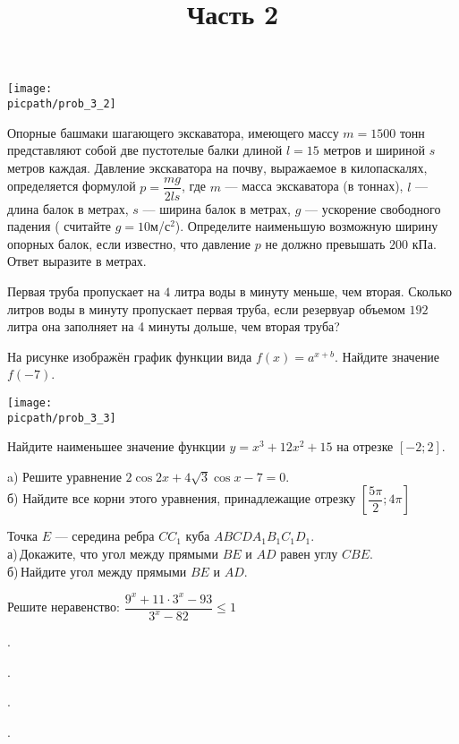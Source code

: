 \begin{training}[1]
\begin{listofex}[resume]
\begin{center}
			\texttt{[image: \\picpath/prob\_3\_2]}
		\end{center}
		\foranswer
		\item Опорные башмаки шагающего экскаватора, имеющего массу \( m=1500 \) тонн представляют собой две пустотелые балки длиной \( l=15 \) метров и шириной \( s \) метров каждая. Давление экскаватора на почву, выражаемое в килопаскалях, определяется формулой \( p=\dfrac{mg}{2ls} \), где \( m \) --- масса экскаватора (в тоннах), \( l \) ---длина балок в метрах, \( s \) --- ширина балок в метрах, \( g \) --- ускорение свободного падения ( считайте \( g=10 \)м/с\( ^2 \)). Определите наименьшую возможную ширину опорных балок, если известно, что давление \( p \) не должно превышать \( 200 \) кПа. Ответ выразите в метрах.
		\foranswer
		\item Первая труба пропускает на \( 4 \) литра воды в минуту меньше, чем вторая. Сколько литров воды в минуту пропускает первая труба, если резервуар объемом \( 192 \) литра она заполняет на 4 минуты дольше, чем вторая труба?
		\foranswer
		\hphantom{Часть 1}
		\item 
		На рисунке изображён график функции вида \( f(x)=a^{x+b} \). Найдите значение \( f(-7) \).
		\begin{center}
			\texttt{[image: \\picpath/prob\_3\_3]}
		\end{center}
		\foranswer
		\item Найдите наименьшее значение функции \( y=x^3+12x^2+15 \) на отрезке \( [-2;2] \).
		\foranswer
		\egepreambtwo
		\title{Часть 2}
		\item a) Решите уравнение \( 2\cos2x+4\sqrt{3}\cos x-7=0	 \). \\
		б) Найдите все корни этого уравнения, принадлежащие отрезку \( \left[ \dfrac{5\pi}{2}; 4\pi \right]  \)
		\hphantom{Часть 1}
		\item Точка \( E \) --- середина ребра \( CC_1 \) куба \( ABCDA_1B_1C_1D_1 \). \\
		а) Докажите, что угол между прямыми \( BE \) и \( AD \) равен углу \( CBE \).\\		
		б) Найдите угол между прямыми \( BE \) и \( AD \).
		\item Решите неравенство: \( \dfrac{9^x+11\cdot3^x-93}{3^x-82}\le1 \)
		\item .
		\item .
		\item .
		\item .
	\end{listofex}
\end{training}

